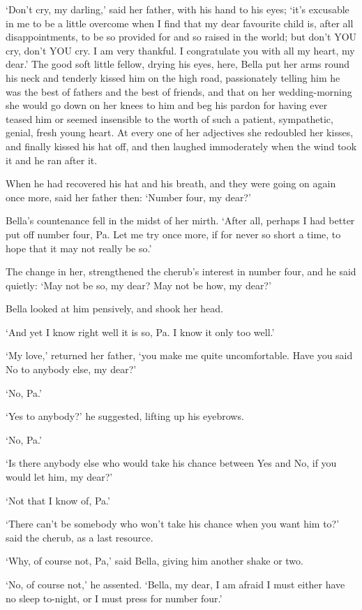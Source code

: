 ‘Don’t cry, my darling,’ said her father, with his hand to his eyes;
‘it’s excusable in me to be a little overcome when I find that my dear
favourite child is, after all disappointments, to be so provided for
and so raised in the world; but don’t YOU cry, don’t YOU cry. I am very
thankful. I congratulate you with all my heart, my dear.’ The good soft
little fellow, drying his eyes, here, Bella put her arms round his neck
and tenderly kissed him on the high road, passionately telling him
he was the best of fathers and the best of friends, and that on her
wedding-morning she would go down on her knees to him and beg his pardon
for having ever teased him or seemed insensible to the worth of such
a patient, sympathetic, genial, fresh young heart. At every one of her
adjectives she redoubled her kisses, and finally kissed his hat off, and
then laughed immoderately when the wind took it and he ran after it.

When he had recovered his hat and his breath, and they were going on
again once more, said her father then: ‘Number four, my dear?’

Bella’s countenance fell in the midst of her mirth. ‘After all, perhaps
I had better put off number four, Pa. Let me try once more, if for never
so short a time, to hope that it may not really be so.’

The change in her, strengthened the cherub’s interest in number four,
and he said quietly: ‘May not be so, my dear? May not be how, my dear?’

Bella looked at him pensively, and shook her head.

‘And yet I know right well it is so, Pa. I know it only too well.’

‘My love,’ returned her father, ‘you make me quite uncomfortable. Have
you said No to anybody else, my dear?’

‘No, Pa.’

‘Yes to anybody?’ he suggested, lifting up his eyebrows.

‘No, Pa.’

‘Is there anybody else who would take his chance between Yes and No, if
you would let him, my dear?’

‘Not that I know of, Pa.’

‘There can’t be somebody who won’t take his chance when you want him
to?’ said the cherub, as a last resource.

‘Why, of course not, Pa,’ said Bella, giving him another shake or two.

‘No, of course not,’ he assented. ‘Bella, my dear, I am afraid I must
either have no sleep to-night, or I must press for number four.’


